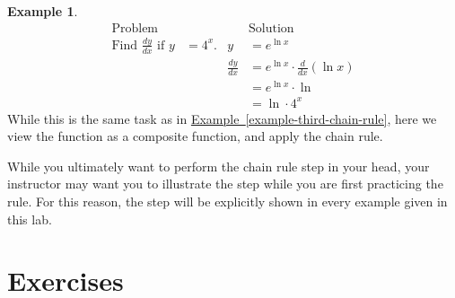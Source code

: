 \documentclass[12pt,]{book}
\theoremstyle{plain}
\theoremstyle{definition}
\newtheorem{example}[theorem]{Example}
\numberwithin{equation}{section}
\newcommand{\fe}[2]{\mathop{{#1}{\left(#2\right)}}}
\newcommand{\lz}[2]{\frac{d#1}{d#2}}
\newcommand{\lzoo}[2]{{\frac{d}{d#1}}{\left(#2\right)}}
\begin{document}
\begin{example}\label{example-fourth-chain-rule}
\begin{align*}
\text{Problem}&&&\text{Solution}\\
\text{Find }\lz{y}{x}\text{ if }y&=4^x\text{.}&y&=e^{\fe{\ln}{4}x}\\
&&\lz{y}{x}&=e^{\fe{\ln}{4}x}\cdot\lzoo{x}{\fe{\ln}{4}x}\\
&&&=e^{\fe{\ln}{4}x}\cdot\fe{\ln}{4}\\
&&&=\fe{\ln}{4}\cdot4^{x}
\end{align*}While this is the same task as in \hyperref[example-third-chain-rule]{Example~\ref*{example-third-chain-rule}}, here we view the function as a composite function, and apply the chain rule.%
\end{example}
\par
While you ultimately want to perform the chain rule step in your head, your instructor may want you to illustrate the step while you are first practicing the rule.  For this reason, the step will be explicitly shown in every example given in this lab.%
\typeout{************************************************}
\typeout{************************************************}
\section*{Exercises}\label{exercises-38}
\end{document}
